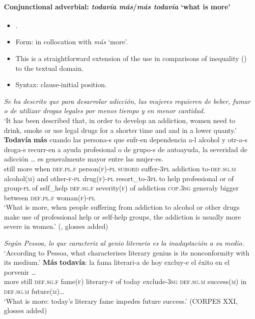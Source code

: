 \paragraph{Conjunctional adverbial: \textit{todavía más}/\textit{más todavía} \lq what is more'}
\label{appendixSpanishTodaviaConjunctionalTodaviaMas}
\begin{itemize}
	\item \textcite[346]{FuentesRodriguez2018}.
	\item Form: in collocation with \textit{más} \lq more'.
	\item This is a straightforward extension of the use in comparisons of inequality () to the textual domain.
	\item Syntax: clause-initial position.
\end{itemize}
\begin{exe}
	\ex 
	\textit{Se ha descrito que para desarrolar adicción, las mujeres requieren de beber, fumar o de utilizar drogas legales por menos tiempo y en menor cantidad.}\\
	\lq It has been described that, in order to develop an addiction, women need to drink, smoke or use legal drugs for a shorter time and and in a lower quanty.'
	\exi{} \gll  \textbf{Todavía} \textbf{más} cuando las persona-s que sufr-en dependencia a-l alcohol y otr-a-s droga-s recurr-en a ayuda profesional o de grupo-s de autoayuda, la severidad de adicción … es generalmente mayor entre las mujer-es.\\
	still more when \textsc{def}.\textsc{pl}.\textsc{f} person(\textsc{f})-\textsc{pl} \textsc{subord} suffer-3\textsc{pl} addiction to-\textsc{def}.\textsc{sg}.\textsc{m} alcohol(\textsc{m}) and other-\textsc{f}-\textsc{pl} drug(\textsc{f})-\textsc{pl} resort\_to-3\textsc{pl} to help professional or of group-\textsc{pl} of self\_help \textsc{def}.\textsc{sg}.\textsc{f} severity(\textsc{f}) of addiction {} \textsc{cop}.3\textsc{sg} generaly bigger between \textsc{def}.\textsc{pl}.\textsc{f} woman(\textsc{f})-\textsc{pl}\\
	\glt \lq What is more, when people suffering from addiction to alcohol or other drugs make use of professional help or self-help groups, the addiction is usually more severe in women.\rq{ }(\cite[346]{FuentesRodriguez2018}, glosses added)

	\ex \textit{Según Pessoa, lo que caracteriz al genio literario es la inadaptación a su medio.}\\
	\lq According to Pessoa, what characterises literary genius is its nonconformity with its medium.'
	\exi{}\gll  \textbf{Más} \textbf{todavía}: la fama literari-a de hoy excluy-e el éxito en el porvenir …\\
	more still \textsc{def}.\textsc{sg}.\textsc{f} fame(\textsc{f}) literary-\textsc{f} of today exclude-3\textsc{sg} \textsc{def}.\textsc{sg}.\textsc{m} success(\textsc{m}) in \textsc{def}.\textsc{sg}.\textsc{m} future(\textsc{m})…\\
	\glt \lq What is more: today's literary fame impedes future success.\rq{ }(CORPES XXI, glosses added)
\end{exe}


